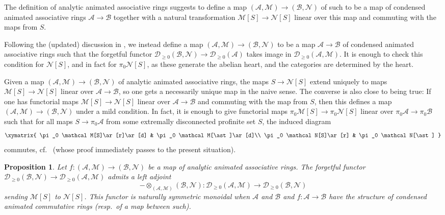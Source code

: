 \documentclass[11pt]{amsbook}
\numberwithin{equation}{section}
\numberwithin{theorem}{section}
\newtheorem{proposition}[theorem]{Proposition}
\theoremstyle{definition}
\begin{document}
The definition of analytic animated associative rings suggests to define a map $(\mathcal A,\mathcal M)\to (\mathcal B,\mathcal N)$ of such to be a map of condensed animated associative rings $\mathcal A\to \mathcal B$ together with a natural transformation $\mathcal M[S]\to \mathcal N[S]$ linear over this map and commuting with the maps from $S$.

Following the (updated) discussion in \cite[Lecture 7]{Condensed}, we instead define a map $(\mathcal A,\mathcal M)\to (\mathcal B,\mathcal N)$ to be a map $\mathcal A\to \mathcal B$ of condensed animated associative rings such that the forgetful functor $\mathcal D_{\geq 0}(\mathcal B,\mathcal N)\to \mathcal D_{\geq 0}(\mathcal A)$ takes image in $\mathcal D_{\geq 0}(\mathcal A,\mathcal M)$. It is enough to check this condition for $\mathcal N[S]$, and in fact for $\pi_0 \mathcal N[S]$, as these generate the abelian heart, and the categories are determined by the heart.

Given a map $(\mathcal A,\mathcal M)\to (\mathcal B,\mathcal N)$ of analytic animated associative rings, the maps $S\to \mathcal N[S]$ extend uniquely to maps $\mathcal M[S]\to \mathcal N[S]$ linear over $\mathcal A\to \mathcal B$, so one gets a necessarily unique map in the naive sense. The converse is also close to being true: If one has functorial maps $\mathcal M[S]\to \mathcal N[S]$ linear over $\mathcal A\to \mathcal B$ and commuting with the map from $S$, then this defines a map $(\mathcal A,\mathcal M)\to (\mathcal B,\mathcal N)$ under a mild condition. In fact, it is enough to give functorial maps $\pi_0 \mathcal M[S]\to \pi_0 \mathcal N[S]$ linear over $\pi_0\mathcal A\to \pi_0\mathcal B$ such that for all maps $S\to \pi_0\mathcal A$ from some extremally disconnected profinite set $S$, the induced diagram
\[\xymatrix{
\pi_0 \mathcal M[S]\ar[r]\ar[d] & \pi_0 \mathcal M[\ast]\ar[d]\\
\pi_0 \mathcal N[S]\ar[r] & \pi_0 \mathcal N[\ast]
}\]
commutes, cf.~\cite[Proposition 7.14]{Condensed} (whose proof immediately passes to the present situation).

\begin{proposition} Let $f: (\mathcal A,\mathcal M)\to (\mathcal B,\mathcal N)$ be a map of analytic animated associative rings. The forgetful functor $\mathcal D_{\geq 0}(\mathcal B,\mathcal N)\to \mathcal D_{\geq 0}(\mathcal A,\mathcal M)$ admits a left adjoint
\[
-\otimes_{(\mathcal A,\mathcal M)} (\mathcal B,\mathcal N): \mathcal D_{\geq 0}(\mathcal A,\mathcal M)\to \mathcal D_{\geq 0}(\mathcal B,\mathcal N)
\]
sending $\mathcal M[S]$ to $\mathcal N[S]$. This functor is naturally symmetric monoidal when $\mathcal A$ and $\mathcal B$ and $f: \mathcal A\to \mathcal B$ have the structure of condensed animated commutative rings (resp.~of a map between such).
\end{proposition}
\end{document}
